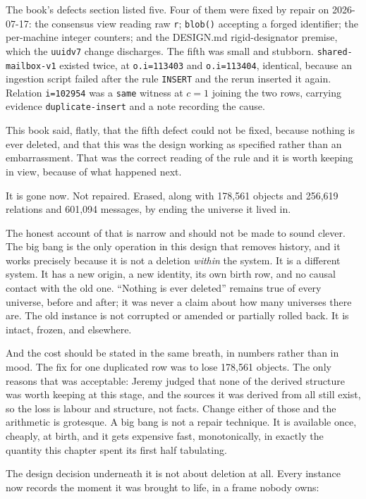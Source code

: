 The book's defects section listed five. Four of them were fixed by repair on 2026-07-17: the consensus view reading raw \texttt{r}; \texttt{blob()} accepting a forged identifier; the per-machine integer counters; and the DESIGN.md rigid-designator premise, which the \texttt{uuidv7} change discharges. The fifth was small and stubborn. \texttt{shared-mailbox-v1} existed twice, at \texttt{o.i=113403} and \texttt{o.i=113404}, identical, because an ingestion script failed after the rule \texttt{INSERT} and the rerun inserted it again. Relation \texttt{i=102954} was a \texttt{same} witness at $c=1$ joining the two rows, carrying evidence \texttt{duplicate-insert} and a note recording the cause.

This book said, flatly, that the fifth defect could not be fixed, because nothing is ever deleted, and that this was the design working as specified rather than an embarrassment. That was the correct reading of the rule and it is worth keeping in view, because of what happened next.

It is gone now. Not repaired. Erased, along with 178{,}561 objects and 256{,}619 relations and 601{,}094 messages, by ending the universe it lived in.

The honest account of that is narrow and should not be made to sound clever. The big bang is the only operation in this design that removes history, and it works precisely because it is not a deletion \emph{within} the system. It is a different system. It has a new origin, a new identity, its own birth row, and no causal contact with the old one. ``Nothing is ever deleted'' remains true of every universe, before and after; it was never a claim about how many universes there are. The old instance is not corrupted or amended or partially rolled back. It is intact, frozen, and elsewhere.

And the cost should be stated in the same breath, in numbers rather than in mood. The fix for one duplicated row was to lose 178{,}561 objects. The only reasons that was acceptable: Jeremy judged that none of the derived structure was worth keeping at this stage, and the sources it was derived from all still exist, so the loss is labour and structure, not facts. Change either of those and the arithmetic is grotesque. A big bang is not a repair technique. It is available once, cheaply, at birth, and it gets expensive fast, monotonically, in exactly the quantity this chapter spent its first half tabulating.

The design decision underneath it is not about deletion at all. Every instance now records the moment it was brought to life, in a frame nobody owns:

